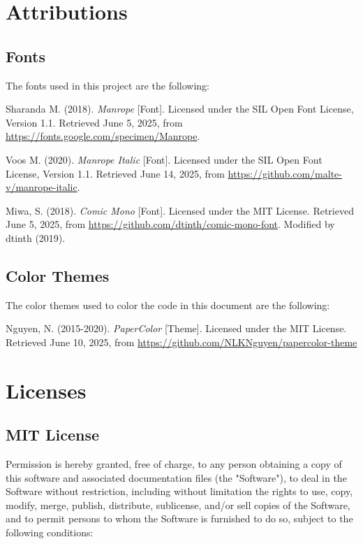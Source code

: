 \chapter{Attributions}

\section{Fonts}

The fonts used in this project are the following:

Sharanda M. (2018). \textit{Manrope} [Font]. Licensed under the SIL Open Font License, Version 1.1. Retrieved June 5, 2025, from \url{https://fonts.google.com/specimen/Manrope}.

Voos M. (2020). \textit{Manrope Italic} [Font]. Licensed under the SIL Open Font License, Version 1.1. Retrieved June 14, 2025, from \url{https://github.com/malte-v/manrope-italic}.

Miwa, S. (2018). \textit{Comic Mono} [Font]. Licensed under the MIT License. Retrieved June 5, 2025, from \url{https://github.com/dtinth/comic-mono-font}. Modified by dtinth (2019).

\section{Color Themes}

The color themes used to color the code in this document are the following:

Nguyen, N. (2015-2020). \textit{PaperColor} [Theme]. Licensed under the MIT License. Retrieved June 10, 2025, from \url{https://github.com/NLKNguyen/papercolor-theme}

\chapter{Licenses}

\section{MIT License}

Permission is hereby granted, free of charge, to any person obtaining a copy of this software and associated documentation files {(the "Software")}, to deal in the Software without restriction, including without limitation the rights to use, copy, modify, merge, publish, distribute, sublicense, and/or sell copies of the Software, and to permit persons to whom the Software is furnished to do so, subject to the following conditions:

